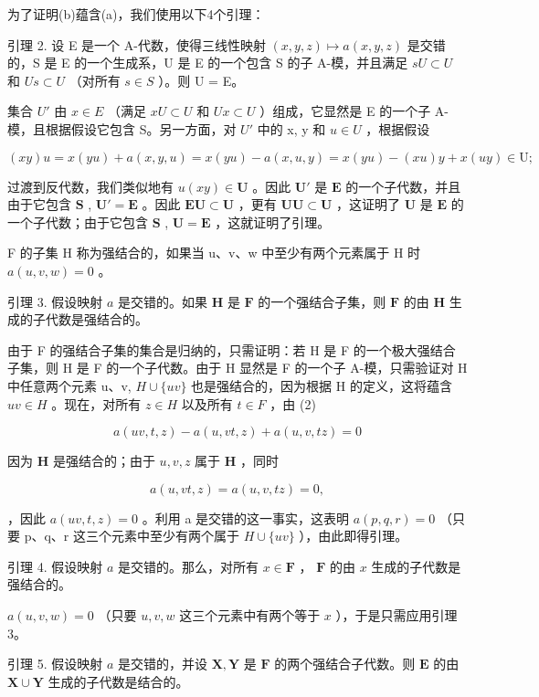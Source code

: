 为了证明(b)蕴含(a)，我们使用以下4个引理：

引理 2. 设 E 是一个 A-代数，使得三线性映射 \((x,y,z)\mapsto a(x,y,z)\) 是交错的，S 是 E 的一个生成系，U 是 E 的一个包含 S 的子 A-模，并且满足 \(sU\subset U\) 和 \(Us\subset U\) （对所有 \(s\in S\) ）。则 U = E。

集合 \(U'\) 由 \(x \in E\) （满足 \(xU \subset U\) 和 \(Ux \subset U\) ）组成，它显然是 E 的一个子 A-模，且根据假设它包含 S。另一方面，对 \(U'\) 中的 x, y 和 \(u \in U\) ，根据假设

\[
(x y) u = x (y u) + a (x, y, u) = x (y u) - a (x, u, y) = x (y u) - (x u) y + x (u y) \in \mathrm{U};
\]

过渡到反代数，我们类似地有 \(u(xy) \in \mathbf{U}\) 。因此 \(\mathbf{U}'\) 是 \(\mathbf{E}\) 的一个子代数，并且由于它包含 \(\mathbf{S}\) , \(\mathbf{U}' = \mathbf{E}\) 。因此 \(\mathbf{EU} \subset \mathbf{U}\) ，更有 \(\mathbf{UU} \subset \mathbf{U}\) ，这证明了 \(\mathbf{U}\) 是 \(\mathbf{E}\) 的一个子代数；由于它包含 \(\mathbf{S}\) , \(\mathbf{U} = \mathbf{E}\) ，这就证明了引理。

F 的子集 H 称为强结合的，如果当 u、v、w 中至少有两个元素属于 H 时 \(a(u, v, w) = 0\) 。

引理 3. 假设映射 \(a\) 是交错的。如果 \(\mathbf{H}\) 是 \(\mathbf{F}\) 的一个强结合子集，则 \(\mathbf{F}\) 的由 \(\mathbf{H}\) 生成的子代数是强结合的。

由于 F 的强结合子集的集合是归纳的，只需证明：若 H 是 F 的一个极大强结合子集，则 H 是 F 的一个子代数。由于 H 显然是 F 的一个子 A-模，只需验证对 H 中任意两个元素 u、v, \(H \cup \{uv\}\) 也是强结合的，因为根据 H 的定义，这将蕴含 \(uv \in H\) 。现在，对所有 \(z \in H\) 以及所有 \(t \in F\) ，由 (2)

\[
a (u v, t, z) - a (u, v t, z) + a (u, v, t z) = 0
\]

因为 \(\mathbf{H}\) 是强结合的；由于 \(u, v, z\) 属于 \(\mathbf{H}\) ，同时

\[
a (u, v t, z) = a (u, v, t z) = 0,
\]

，因此 \(a(uv, t, z) = 0\) 。利用 a 是交错的这一事实，这表明 \(a(p, q, r) = 0\) （只要 p、q、r 这三个元素中至少有两个属于 \(H \cup \{uv\}\) ），由此即得引理。

引理 4. 假设映射 \(a\) 是交错的。那么，对所有 \(x \in \mathbf{F}\) ， \(\mathbf{F}\) 的由 \(x\) 生成的子代数是强结合的。

\(a(u,v,w) = 0\) （只要 \(u, v, w\) 这三个元素中有两个等于 \(x\) ），于是只需应用引理 3。

引理 5. 假设映射 \(a\) 是交错的，并设 \(\mathbf{X}, \mathbf{Y}\) 是 \(\mathbf{F}\) 的两个强结合子代数。则 \(\mathbf{E}\) 的由 \(\mathbf{X} \cup \mathbf{Y}\) 生成的子代数是结合的。

